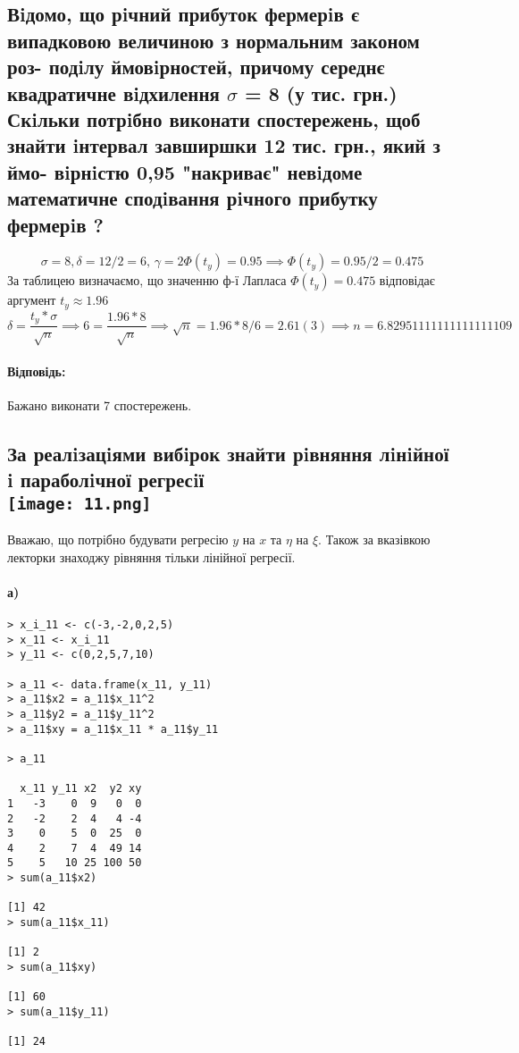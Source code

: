 \documentclass[a4paper, 12pt, oneside]{extarticle}
\newcommand{\Problem}{\subsection}
\newcommand{\Answer}[1]{
\medskip
\null\hfill
\begin{boxedminipage}{\textwidth}
	\paragraph{Відповідь: }{#1}
\end{boxedminipage}
}
\begin{document}


\setcounter{subsection}{9}

\Problem{
	Вiдомо, що рiчний прибуток фермерiв є випадковою величиною з нормальним законом роз-
подiлу ймовiрностей, причому середнє квадратичне вiдхилення $\sigma$ = 8 (у тис. грн.) Скiльки
потрiбно виконати спостережень, щоб знайти iнтервал завширшки 12 тис. грн., який з ймо-
вiрнiстю 0,95 "накриває" невiдоме математичне сподiвання рiчного прибутку фермерiв ?
}

$$
\sigma = 8,
\delta = 12/2 = 6,\,
\gamma = 2\Phi(t_y) = 0.95 \implies \Phi(t_y) = 0.95/2 = 0.475
$$
За таблицею визначаємо, що
значенню ф-ї Лапласа $\Phi(t_y) = 0.475$ відповідає аргумент $t_y\approx 1.96$
$$
\delta = \frac{t_y*\sigma}{\sqrt n} \implies
6 = \frac{1.96*8}{\sqrt n} \implies
\sqrt n = 1.96*8/6 = 2.61(3) \implies
n = 6.82951111111111111109
$$

\Answer{
	Бажано виконати 7 спостережень.
}

\Problem{
	За реалiзацiями вибiрок знайти рiвняння лiнiйної i параболiчної
	регресiї
	\\
	\texttt{[image: 11.png]}
	\\
}
Вважаю, що потрібно будувати регресію $y$ на $x$ та $\eta$ на $\xi$. Також за вказівкою лекторки знаходжу рівняння тільки лінійної регресії.

\paragraph{а) }

\begin{verbatim}
> x_i_11 <- c(-3,-2,0,2,5)
> x_11 <- x_i_11
> y_11 <- c(0,2,5,7,10)

> a_11 <- data.frame(x_11, y_11)
> a_11$x2 = a_11$x_11^2
> a_11$y2 = a_11$y_11^2
> a_11$xy = a_11$x_11 * a_11$y_11

> a_11

  x_11 y_11 x2  y2 xy
1   -3    0  9   0  0
2   -2    2  4   4 -4
3    0    5  0  25  0
4    2    7  4  49 14
5    5   10 25 100 50
> sum(a_11$x2)

[1] 42
> sum(a_11$x_11)

[1] 2
> sum(a_11$xy)

[1] 60
> sum(a_11$y_11)

[1] 24
\end{verbatim}
\end{document}

